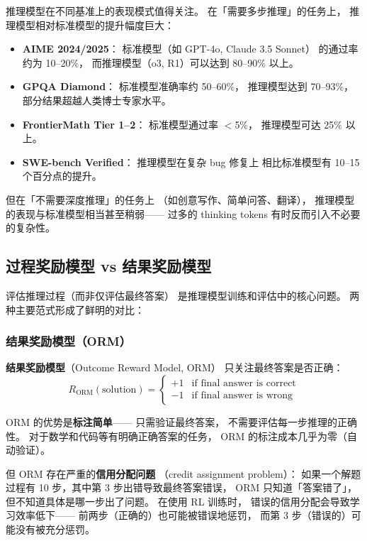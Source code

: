 推理模型在不同基准上的表现模式值得关注。
在「需要多步推理」的任务上，
推理模型相对标准模型的提升幅度巨大：
\begin{itemize}[noitemsep]
  \item \textbf{AIME 2024/2025}：
        标准模型（如 GPT-4o, Claude 3.5 Sonnet）
        的通过率约为 10--20\%，
        而推理模型（o3, R1）可以达到 80--90\% 以上。
  \item \textbf{GPQA Diamond}：
        标准模型准确率约 50--60\%，
        推理模型达到 70--93\%，
        部分结果超越人类博士专家水平。
  \item \textbf{FrontierMath Tier 1--2}：
        标准模型通过率 $<$5\%，
        推理模型可达 25\% 以上。
  \item \textbf{SWE-bench Verified}：
        推理模型在复杂 bug 修复上
        相比标准模型有 10--15 个百分点的提升。
\end{itemize}

但在「不需要深度推理」的任务上
（如创意写作、简单问答、翻译），
推理模型的表现与标准模型相当甚至稍弱——
过多的 thinking tokens 有时反而引入不必要的复杂性。

\subsection{过程奖励模型 vs 结果奖励模型}
\label{subsec:prm-vs-orm}

评估推理过程（而非仅评估最终答案）
是推理模型训练和评估中的核心问题。
两种主要范式形成了鲜明的对比：

\subsubsection{结果奖励模型（ORM）}

\textbf{结果奖励模型}（Outcome Reward Model, ORM）
只关注最终答案是否正确：
\begin{equation}
  R_{\text{ORM}}(\text{solution}) =
  \begin{cases}
    +1 & \text{if final answer is correct} \\
    -1 & \text{if final answer is wrong}
  \end{cases}
  \label{eq:orm}
\end{equation}

ORM 的优势是\textbf{标注简单}——
只需验证最终答案，
不需要评估每一步推理的正确性。
对于数学和代码等有明确正确答案的任务，
ORM 的标注成本几乎为零（自动验证）。

但 ORM 存在严重的\textbf{信用分配问题}
（credit assignment problem）：
如果一个解题过程有 10 步，其中第 3 步出错导致最终答案错误，
ORM 只知道「答案错了」，
但不知道具体是哪一步出了问题。
在使用 RL 训练时，
错误的信用分配会导致学习效率低下——
前两步（正确的）也可能被错误地惩罚，
而第 3 步（错误的）可能没有被充分惩罚。

